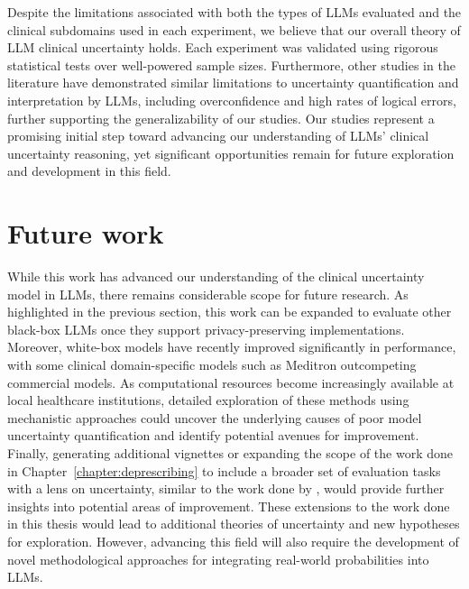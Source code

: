 Despite the limitations associated with both the types of LLMs evaluated and the clinical subdomains used in each experiment, we believe that our overall theory of LLM clinical uncertainty holds. Each experiment was validated using rigorous statistical tests over well-powered sample sizes. Furthermore, other studies in the literature have demonstrated similar limitations to uncertainty quantification and interpretation by LLMs, including overconfidence and high rates of logical errors\citep{savageLargeLanguageModel2024, huangFutureAIClinicians2024}, further supporting the generalizability of our studies. Our studies represent a promising initial step toward advancing our understanding of LLMs' clinical uncertainty reasoning, yet significant opportunities remain for future exploration and development in this field.

\section{Future work}
While this work has advanced our understanding of the clinical uncertainty model in LLMs, there remains considerable scope for future research. As highlighted in the previous section, this work can be expanded to evaluate other black-box LLMs once they support privacy-preserving implementations. Moreover, white-box models have recently improved significantly in performance, with some clinical domain-specific models such as Meditron \citep{chenMEDITRON70BScalingMedical2023} outcompeting commercial models. As computational resources become increasingly available at local healthcare institutions, detailed exploration of these methods using mechanistic approaches could uncover the underlying causes of poor model uncertainty quantification and identify potential avenues for improvement. Finally, generating additional vignettes or expanding the scope of the work done in Chapter~\ref{chapter:deprescribing} to include a broader set of evaluation tasks with a lens on uncertainty, similar to the work done by \citet{savageLargeLanguageModel2024}, would provide further insights into potential areas of improvement. These extensions to the work done in this thesis would lead to additional theories of uncertainty and new hypotheses for exploration. However, advancing this field will also require the development of novel methodological approaches for integrating real-world probabilities into LLMs.

